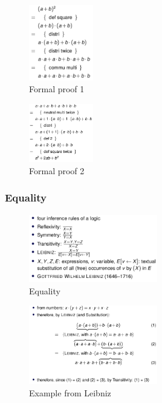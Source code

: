 \begin{figure}[H]
\centering
\includegraphics[width=0.25\textwidth]{figures/formalproof1.png}
\caption{Formal proof 1}
\end{figure}

\begin{figure}[H]
\centering
\includegraphics[width=0.25\textwidth]{figures/formalproof2.png}
\caption{Formal proof 2}
\end{figure}

\hypertarget{equality}{%
\subsubsection{Equality}\label{equality}}

\begin{figure}[H]
\centering
\includegraphics[width=0.5\textwidth]{figures/equality.png}
\caption{Equality}
\end{figure}

\begin{figure}[H]
\centering
\includegraphics[width=0.5\textwidth]{figures/leibniz.png}
\caption{Example from Leibniz}
\end{figure}

